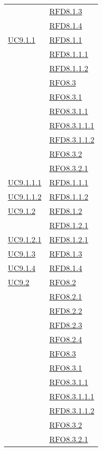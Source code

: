 \begin{longtable}{|>{\centering}m{5cm}|m{5cm}<{\centering}|}
& \hyperlink{RFD8.1.3}{RFD8.1.3}\\
& \hyperlink{RFD8.1.4}{RFD8.1.4}\\ \hline
\hyperref[UC9.1.1]{UC9.1.1} & \hyperlink{RFD8.1.1}{RFD8.1.1}\\
& \hyperlink{RFD8.1.1.1}{RFD8.1.1.1}\\
& \hyperlink{RFD8.1.1.2}{RFD8.1.1.2}\\
& \hyperlink{RFO8.3}{RFO8.3}\\
& \hyperlink{RFO8.3.1}{RFO8.3.1}\\
& \hyperlink{RFO8.3.1.1}{RFO8.3.1.1}\\
& \hyperlink{RFO8.3.1.1.1}{RFO8.3.1.1.1}\\
& \hyperlink{RFD8.3.1.1.2}{RFD8.3.1.1.2}\\
& \hyperlink{RFO8.3.2}{RFO8.3.2}\\
& \hyperlink{RFO8.3.2.1}{RFO8.3.2.1}\\ \hline
\hyperref[UC9.1.1.1]{UC9.1.1.1} & \hyperlink{RFD8.1.1.1}{RFD8.1.1.1}\\ \hline
\hyperref[UC9.1.1.2]{UC9.1.1.2} & \hyperlink{RFD8.1.1.2}{RFD8.1.1.2}\\ \hline
\hyperref[UC9.1.2]{UC9.1.2} & \hyperlink{RFD8.1.2}{RFD8.1.2}\\
& \hyperlink{RFD8.1.2.1}{RFD8.1.2.1}\\ \hline
\hyperref[UC9.1.2.1]{UC9.1.2.1} & \hyperlink{RFD8.1.2.1}{RFD8.1.2.1}\\ \hline
\hyperref[UC9.1.3]{UC9.1.3} & \hyperlink{RFD8.1.3}{RFD8.1.3}\\ \hline
\hyperref[UC9.1.4]{UC9.1.4} & \hyperlink{RFD8.1.4}{RFD8.1.4}\\ \hline
\hyperref[UC9.2]{UC9.2} & \hyperlink{RFO8.2}{RFO8.2}\\
& \hyperlink{RFO8.2.1}{RFO8.2.1}\\
& \hyperlink{RFD8.2.2}{RFD8.2.2}\\
& \hyperlink{RFD8.2.3}{RFD8.2.3}\\
& \hyperlink{RFO8.2.4}{RFO8.2.4}\\
& \hyperlink{RFO8.3}{RFO8.3}\\
& \hyperlink{RFO8.3.1}{RFO8.3.1}\\
& \hyperlink{RFO8.3.1.1}{RFO8.3.1.1}\\
& \hyperlink{RFO8.3.1.1.1}{RFO8.3.1.1.1}\\
& \hyperlink{RFD8.3.1.1.2}{RFD8.3.1.1.2}\\
& \hyperlink{RFO8.3.2}{RFO8.3.2}\\
& \hyperlink{RFO8.3.2.1}{RFO8.3.2.1}\\ \hline

\end{longtable}
